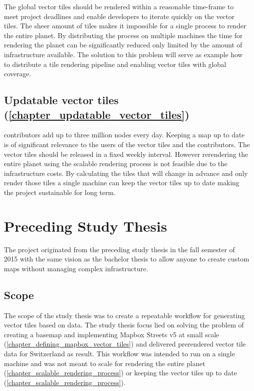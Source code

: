 The global vector tiles should be rendered within a reasonable time-frame
to meet project deadlines and enable developers to iterate quickly on the vector tiles.
The sheer amount of tiles makes it impossible for a single process to render the entire planet.
By distributing the process on multiple machines the time for rendering the planet can be significantly reduced only limited
by the amount of infrastructure available. The solution to this problem will serve as example how to distribute a tile rendering pipeline and enabling
vector tiles with global coverage.

\subsection*{Updatable vector tiles (\autoref{chapter_updatable_vector_tiles})}\label{intro_scalable_rendering_process}

\osm{} contributors add up to three million nodes every day\cite{osm_wiki_2016}. Keeping a map up to date is of significant relevance to the users of the vector tiles and the contributors. The vector tiles should be released in a fixed weekly interval.
However rerendering the entire planet using the scalable rendering process is not feasible due to the infrastructure costs. By calculating the tiles that will change in advance and only render those tiles a single machine can keep the vector tiles up to date making the project sustainable for long term.

\section{Preceding Study Thesis}\label{part1_scope_of_study_thesis}

The \osmvt{} project originated from the preceding study thesis in the fall semester of 2015 with the same vision as the bachelor thesis to allow anyone to create custom \osm{} maps without managing complex infrastructure. 

\subsection*{Scope}\label{part1_scope}

The scope of the study thesis was to create a repeatable workflow for generating vector tiles based on \osm{} data. The study thesis focus lied on solving the problem of creating a basemap and implementing Mapbox Streets v5 at small scale (\autoref{chapter_defining_mapbox_vector_tiles}) and delivered prerendered vector tile data for Switzerland as result.
This workflow was intended to run on a single machine and was not meant to scale for rendering the entire planet (\autoref{chapter_scalable_rendering_process}) or keeping the vector tiles up to date (\autoref{chapter_scalable_rendering_process}).


